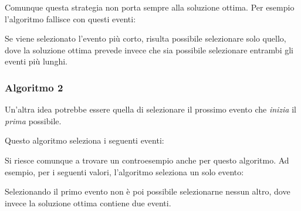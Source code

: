 Comunque questa strategia non porta sempre alla soluzione ottima.
Per esempio l'algoritmo fallisce con questi eventi:
\begin{center}
\end{center}
Se viene selezionato l'evento più corto, risulta possibile selezionare solo quello,
dove la soluzione ottima prevede invece che sia possibile selezionare entrambi gli eventi più lunghi.

\subsubsection*{Algoritmo 2}

Un'altra idea potrebbe essere quella di selezionare
il prossimo evento che \emph{inizia} il \emph{prima} possibile.

Questo algoritmo seleziona i seguenti eventi:
\begin{center}
\end{center}
 
Si riesce comunque a trovare un controesempio anche 
per questo algoritmo.
Ad esempio, per i seguenti valori,
l'algoritmo seleziona un solo evento:
\begin{center}
\end{center}
Selezionando il primo evento non è poi possibile
selezionarne nessun altro, dove invece la soluzione ottima
contiene due eventi.

